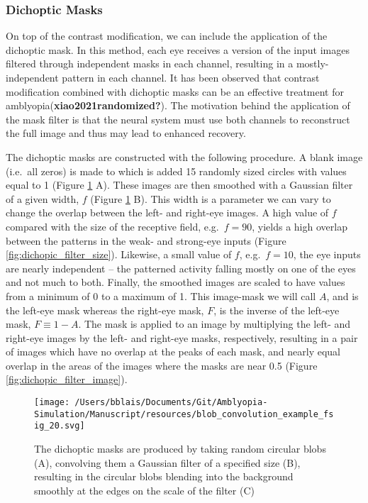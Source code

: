\documentclass[
  onecolumn]{article}
\begin{document}
\hypertarget{dichoptic-masks}{%
\subsubsection{Dichoptic Masks}\label{dichoptic-masks}}

On top of the contrast modification, we can include the application of
the dichoptic mask. In this method, each eye receives a version of the
input images filtered through independent masks in each channel,
resulting in a mostly-independent pattern in each channel. It has been
observed that contrast modification combined with dichoptic masks can be
an effective treatment for amblyopia(\textbf{xiao2021randomized?}). The
motivation behind the application of the mask filter is that the neural
system must use both channels to reconstruct the full image and thus may
lead to enhanced recovery.

The dichoptic masks are constructed with the following procedure. A
blank image (i.e.~all zeros) is made to which is added 15 randomly sized
circles with values equal to 1 (Figure \ref{fig:dichopic_blob} A). These
images are then smoothed with a Gaussian filter of a given width, \(f\)
(Figure \ref{fig:dichopic_blob} B). This width is a parameter we can
vary to change the overlap between the left- and right-eye images. A
high value of \(f\) compared with the size of the receptive field,
e.g.~\(f=90\), yields a high overlap between the patterns in the weak-
and strong-eye inputs (Figure \ref{fig:dichopic_filter_size}). Likewise,
a small value of \(f\), e.g.~\(f=10\), the eye inputs are nearly
independent -- the patterned activity falling mostly on one of the eyes
and not much to both. Finally, the smoothed images are scaled to have
values from a minimum of 0 to a maximum of 1. This image-mask we will
call \(A\), and is the left-eye mask whereas the right-eye mask, \(F\),
is the inverse of the left-eye mask, \(F\equiv 1-A\). The mask is
applied to an image by multiplying the left- and right-eye images by the
left- and right-eye masks, respectively, resulting in a pair of images
which have no overlap at the peaks of each mask, and nearly equal
overlap in the areas of the images where the masks are near 0.5 (Figure
\ref{fig:dichopic_filter_image}).

\begin{figure}
\hypertarget{fig:dichopic_blob}{%
\centering
\texttt{[image: /Users/bblais/Documents/Git/Amblyopia-Simulation/Manuscript/resources/blob\_convolution\_example\_fsig\_20.svg]}
\caption{The dichoptic masks are produced by taking random circular
blobs (A), convolving them a Gaussian filter of a specified size (B),
resulting in the circular blobs blending into the background smoothly at
the edges on the scale of the filter (C)}\label{fig:dichopic_blob}
}
\end{figure}
\end{document}
